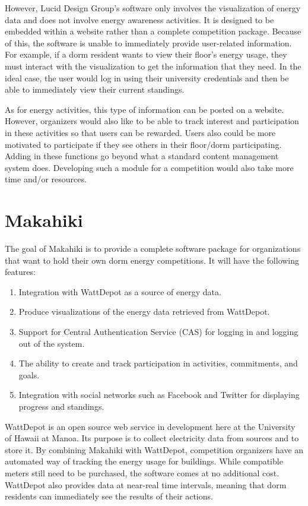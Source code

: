 However, Lucid Design Group's software only involves the visualization of energy data and does not involve energy awareness activities.  It is designed to be embedded within a website rather than a complete competition package.  Because of this, the software is unable to immediately provide user-related information.  For example, if a dorm resident wants to view their floor's energy usage, they must interact with the visualization to get the information that they need.  In the ideal case, the user would log in using their university credentials and then be able to immediately view their current standings.

As for energy activities, this type of information can be posted on a website.  However, organizers would also like to be able to track interest and participation in these activities so that users can be rewarded.  Users also could be more motivated to participate if they see others in their floor/dorm participating.  Adding in these functions go beyond what a standard content management system does.  Developing such a module for a competition would also take more time and/or resources.

\section{Makahiki}

The goal of Makahiki is to provide a complete software package for organizations that want to hold their own dorm energy competitions.  It will have the following features:

\begin{enumerate}
	\item Integration with WattDepot as a source of energy data.
	\item Produce visualizations of the energy data retrieved from WattDepot.
	\item Support for Central Authentication Service (CAS) for logging in and logging out of the system.
	\item The ability to create and track participation in activities, commitments, and goals.
	\item Integration with social networks such as Facebook and Twitter for displaying progress and standings.
\end{enumerate}

WattDepot\cite{wattdepot} is an open source web service in development here at the University of Hawaii at Manoa.  Its purpose is to collect electricity data from sources and to store it.  By combining Makahiki with WattDepot, competition organizers have an automated way of tracking the energy usage for buildings.  While compatible meters still need to be purchased, the software comes at no additional cost.  WattDepot also provides data at near-real time intervals, meaning that dorm residents can immediately see the results of their actions.

